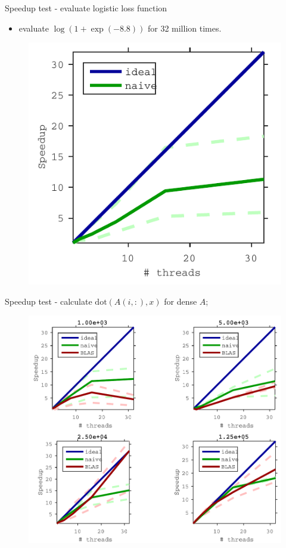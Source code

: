 \documentclass[hyperref,handout,compress,9pt,mathserif]{beamer}
\begin{document}
\begin{frame}{Speedup test - evaluate logistic loss function}
\begin{itemize}
\item evaluate $\log(1 + \exp(-8.8))$ for 32 million times.
\end{itemize}

\begin{figure}[!h]
        \centering
                \includegraphics[width=.5\textwidth]{./figs/log_loss_cropped.pdf}
\end{figure}
\end{frame}


\begin{frame}{Speedup test - calculate $\text{dot}(A(i, :), x)$ for dense $A$;}
\begin{figure}[!h]
        \centering
                \includegraphics[width=.8\textwidth]{./figs/ds_matrix_ds_vec_speedup_cropped.pdf}
\end{figure}
\end{frame}
\end{document}

